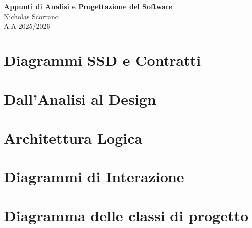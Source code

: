 \documentclass[12pt]{report}
\begin{document}
\vspace*{\fill}
\begin{center}
    {\Huge \textbf{Appunti di Analisi e Progettazione del Software}} \\[0.5cm]
    {\Large Nicholas Scorrano} \\[0.3cm]
    {\large A.A 2025/2026}
\end{center}
\vspace*{\fill}

\newpage

\setcounter{chapter}{2}

\chapter{Diagrammi SSD e Contratti}

\chapter{Dall'Analisi al Design}

\chapter{Architettura Logica}

\chapter{Diagrammi di Interazione}

\chapter{Diagramma delle classi di progetto}

\end{document}
